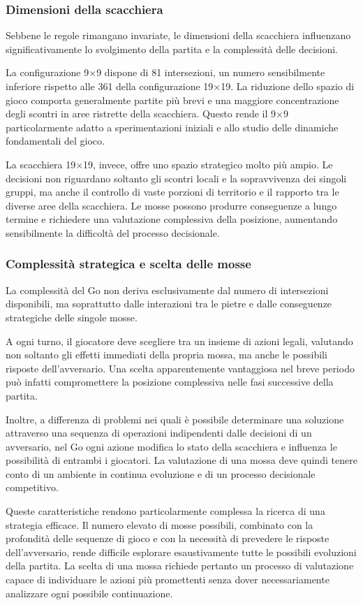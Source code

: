 \subsubsection{Dimensioni della scacchiera}

Sebbene le regole rimangano invariate, le dimensioni della scacchiera influenzano significativamente lo svolgimento della partita e la complessità delle decisioni.

La configurazione 9×9 dispone di 81 intersezioni, un numero sensibilmente inferiore rispetto alle 361 della configurazione 19×19. La riduzione dello spazio di gioco comporta generalmente partite più brevi e una maggiore concentrazione degli scontri in aree ristrette della scacchiera. Questo rende il 9×9 particolarmente adatto a sperimentazioni iniziali e allo studio delle dinamiche fondamentali del gioco.

La scacchiera 19×19, invece, offre uno spazio strategico molto più ampio. Le decisioni non riguardano soltanto gli scontri locali e la sopravvivenza dei singoli gruppi, ma anche il controllo di vaste porzioni di territorio e il rapporto tra le diverse aree della scacchiera. Le mosse possono produrre conseguenze a lungo termine e richiedere una valutazione complessiva della posizione, aumentando sensibilmente la difficoltà del processo decisionale.

\subsubsection{Complessità strategica e scelta delle mosse}

La complessità del Go non deriva esclusivamente dal numero di intersezioni disponibili, ma soprattutto dalle interazioni tra le pietre e dalle conseguenze strategiche delle singole mosse.

A ogni turno, il giocatore deve scegliere tra un insieme di azioni legali, valutando non soltanto gli effetti immediati della propria mossa, ma anche le possibili risposte dell'avversario. Una scelta apparentemente vantaggiosa nel breve periodo può infatti compromettere la posizione complessiva nelle fasi successive della partita.

Inoltre, a differenza di problemi nei quali è possibile determinare una soluzione attraverso una sequenza di operazioni indipendenti dalle decisioni di un avversario, nel Go ogni azione modifica lo stato della scacchiera e influenza le possibilità di entrambi i giocatori.
La valutazione di una mossa deve quindi tenere conto di un ambiente in continua evoluzione e di un processo decisionale competitivo.

Queste caratteristiche rendono particolarmente complessa la ricerca di una strategia efficace. Il numero elevato di mosse possibili, combinato con la profondità delle sequenze di gioco e con la necessità di prevedere le risposte dell'avversario, rende difficile esplorare esaustivamente tutte le possibili evoluzioni della partita. La scelta di una mossa richiede pertanto un processo di valutazione capace di individuare le azioni più promettenti senza dover necessariamente analizzare ogni possibile continuazione.
